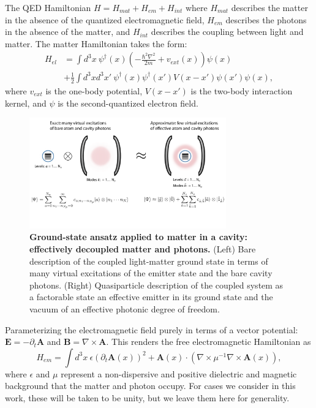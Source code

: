 \documentclass[aps,prl,twocolumn,
	groupedaddress,superscriptaddress,
	amsfonts,amssymb,amsmath,floatfix,
	citeautoscript]{revtex4-1}
\newcommand{\Jadd}[1]{\textcolor{blue}{#1}}
\begin{document}
The QED Hamiltonian  $H = H_{mat}+H_{em}+H_{int}$ where $H_{mat}$ describes the matter in the absence of the quantized electromagnetic field, $H_{em}$ describes the photons in the absence of the matter, and $H_{int}$ describes the coupling between light and matter. The matter Hamiltonian takes the form:
\begin{align}
H_{el} &= \int d^3x ~\psi^{\dagger}(x)\left(-\frac{\hbar^2\nabla^2}{2m} + v_{ext}(x) \right)\psi(x) \nonumber \\ &+ \frac{1}{2}\int d^3x d^3x'~ \psi^{\dagger}(x)\psi^{\dagger}(x')V(x-x')\psi(x')\psi(x),
\end{align}
where $v_{ext}$ is the one-body potential, $V(x-x')$ is the two-body interaction kernel, and $\psi$ is the second-quantized electron field. %
\begin{figure}[t]
\includegraphics[width=8.5cm]{conceptfigure.pdf}
\caption{\textbf{Ground-state ansatz applied to matter in a cavity: effectively decoupled matter and photons.} (Left) Bare description of the coupled light-matter ground state in terms of many virtual excitations of the emitter state and the bare cavity photons. (Right) Quasiparticle description of the coupled system as a factorable state an effective emitter in its ground state and the vacuum of an effective photonic degree of freedom.}
\label{fig:ansatz}
\end{figure}
Parameterizing the electromagnetic field purely in terms of a vector potential: $\mathbf{E} = -\partial_t\mathbf{A}$ and $\mathbf{B} = \nabla\times\mathbf{A}$. This renders the free electromagnetic Hamiltonian as
\begin{equation}
H_{em} = \int d^3x~ \epsilon (\partial_t \mathbf{A}(x))^2 + \mathbf{A}(x)\cdot(\nabla\times\mu^{-1}\nabla\times\mathbf{A}(x)),
\end{equation}
where $\epsilon$ and $\mu$ represent a non-dispersive and positive dielectric and magnetic background that the matter and photon occupy. For cases we consider in this work, these will be taken to be unity, but we leave them here for generality.
\end{document}
